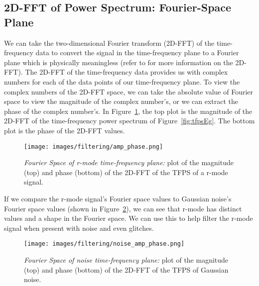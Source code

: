 \documentclass[%
reprint,
amsmath,amssymb,
aps,
]{revtex4-1}
\begin{document}
	
	
	\subsection{2D-FFT of Power Spectrum: Fourier-Space Plane}
	We can take the two-dimensional Fourier transform (2D-FFT) of the time-frequency data to convert the signal in the time-frequency plane to a Fourier plane which is physically meaningless (refer to \cite{2dFFTpaper} for more information on the 2D-FFT).  The 2D-FFT of the time-frequency data provides us with complex numbers for each of the data points of our time-frequency plane. To view the complex numbers of the 2D-FFT space, we can take the absolute value of Fourier space to view the magnitude of the complex number's, or we can extract the phase of the complex number's. In Figure~\ref{fig:2dfft(tfps)}, the top plot is the magnitude of the 2D-FFT of the time-frequency power spectrum of Figure~\ref{fig:tfpsEg}. The bottom plot is the phase of the 2D-FFT values.  
	
	\begin{figure}[h]
		\centering
		\texttt{[image: images/filtering/amp\_phase.png]}
		\caption{\textit{Fourier Space of r-mode time-frequency plane:} plot of the magnitude (top) and phase (bottom) of the 2D-FFT of the TFPS of a r-mode signal.}
		\label{fig:2dfft(tfps)}
	\end{figure}
	
	
	If we compare the r-mode signal's Fourier space values to Gaussian noise's Fourier space values (shown in Figure~\ref{fig:2dfft(noise)}), we can see that r-mode has distinct values and a shape in the Fourier space. We can use this to help filter the r-mode signal when present with noise and even glitches. 
	
	\begin{figure}[h]
		\centering
		\texttt{[image: images/filtering/noise\_amp\_phase.png]}
		\caption{\textit{Fourier Space of noise time-frequency plane:} plot of the magnitude (top) and phase (bottom) of the 2D-FFT of the TFPS of Gaussian noise.}
		\label{fig:2dfft(noise)}
	\end{figure}
	
\end{document}
